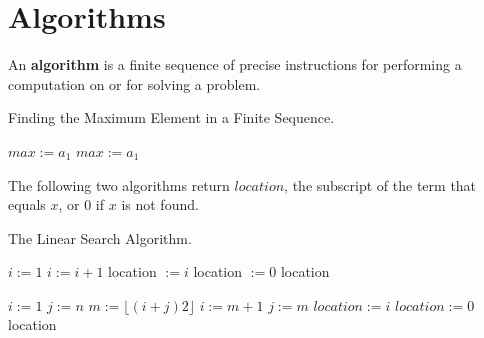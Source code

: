 \chapter{Algorithms}

An \textbf{algorithm} is a finite sequence of precise instructions for
performing a computation on or for solving a problem.

\begin{algorithm}
  \caption{Finding the Maximum Element in a Finite Sequence.\cite[p.~193]{rosen}}
  \begin{algorithmic}[1]
      \State $max := a_1$
          $max := a_1$
        \EndIf
      \EndFor
    \EndProcedure
  \end{algorithmic}
\end{algorithm}

The following two algorithms return $location$, the subscript of the term that
equals $x$, or $0$ if $x$ is not found.
\begin{algorithm}
  \caption{The Linear Search Algorithm.\cite[p.~194]{rosen}}
  \begin{algorithmic}[1]
      \State $i:=1$
        \State $i:= i+1$
      \EndWhile
        \State location $:= i$
        \Else 
        \State location $:= 0$
      \EndIf
      \State \Return location
    \EndProcedure
  \end{algorithmic}
\end{algorithm}
\begin{algorithm}
  \begin{algorithmic}
      \State $i:= 1$
      \State $j:=n$
        \State $m:=\lfloor (i+j)2 \rfloor$
          \State $i:=m+1$
        \Else
          \State $j:=m$
        \EndIf
      \EndWhile
        \State $location:=i$
      \Else
        \State $location:=0$
      \EndIf
      \State \Return location 
    \EndProcedure
  \end{algorithmic}
\end{algorithm}

